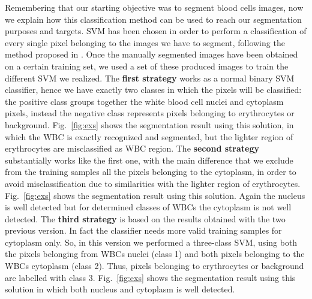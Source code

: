 \documentclass[final,a4paper,12pt,english]{UnicaPhdThesis3}
\begin{document}
	Remembering that our starting objective was to segment blood cells images, now we explain how this classification method can be used to reach our segmentation purposes and targets. SVM has been chosen in order to perform a classification of every single pixel belonging to the images we have to segment, following the method proposed in \cite{pan}. Once the manually segmented images have been obtained on a certain training set, we used a set of these produced images to train the different SVM we realized. The \textbf{first strategy} works as a normal binary SVM classifier, hence we have exactly two classes in which the pixels will be classified: the positive class groups together the white blood cell nuclei and cytoplasm pixels, instead the negative class represents pixels belonging to erythrocytes or background. Fig.~\ref{fig:exs} shows the segmentation result using this solution, in which the WBC is exactly recognized and segmented, but the lighter region of erythrocytes are misclassified as WBC region. The \textbf{second strategy} substantially works like the first one, with the main difference that we exclude from the training samples all the pixels belonging to the cytoplasm, in order to avoid misclassification due to similarities with the lighter region of erythrocytes. Fig.~\ref{fig:exs} shows the segmentation result using this solution. Again the nucleus is well detected but for determined classes of WBCs the cytoplasm is not well detected. The \textbf{third strategy} is based on the results obtained with the two previous version. In fact the classifier needs more valid training samples for cytoplasm only. So, in this version we performed a three-class SVM, using both the pixels belonging from WBCs nuclei (class 1) and both pixels belonging to the WBCs cytoplasm (class 2). Thus, pixels belonging to erythrocytes or background are labelled with class 3. Fig.~\ref{fig:exs} shows the segmentation result using this solution in which both nucleus and cytoplasm is well detected.
\end{document}
